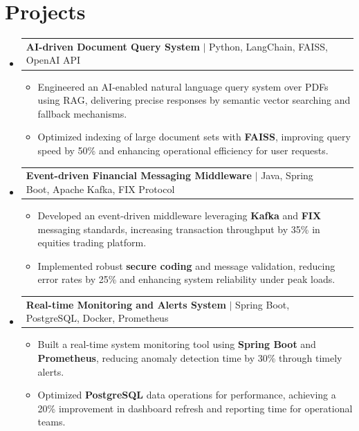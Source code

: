 \documentclass[letterpaper,11pt]{article}
\makeatletter
\newcommand{\resumeItem}[1]{
  \item\footnotesize{
    {#1 \vspace{-2pt}}
  }
}
\newcommand{\resumeProjectHeading}[2]{
    \item
    \begin{tabular*}{1.001\textwidth}{l@{\extracolsep{\fill}}r}
      \small#1 & \textbf{\small #2}\\
    \end{tabular*}\vspace{-7pt}
}
\newcommand{\resumeSubHeadingListStart}{\begin{itemize}[leftmargin=0pt, label={}]}
\newcommand{\resumeSubHeadingListEnd}{\end{itemize}}
\newcommand{\resumeItemListStart}{\begin{itemize}[leftmargin=*]}
\newcommand{\resumeItemListEnd}{\end{itemize}\vspace{-5pt}}
\makeatother
\begin{document}
\section{Projects}
    \vspace{-5pt}
    \resumeSubHeadingListStart

      \resumeProjectHeading
          {\textbf{AI-driven Document Query System} $|$ Python, LangChain, FAISS, OpenAI API}{ }
        \resumeItemListStart
            \resumeItem{Engineered an AI-enabled natural language query system over PDFs using RAG, delivering precise responses by semantic vector searching and fallback mechanisms.}
            \resumeItem{Optimized indexing of large document sets with \textbf{FAISS}, improving query speed by 50\% and enhancing operational efficiency for user requests.}
        \resumeItemListEnd
        \vspace{-12pt}

      \resumeProjectHeading
          {\textbf{Event-driven Financial Messaging Middleware} $|$ Java, Spring Boot, Apache Kafka, FIX Protocol}{ }
        \resumeItemListStart
            \resumeItem{Developed an event-driven middleware leveraging \textbf{Kafka} and \textbf{FIX} messaging standards, increasing transaction throughput by 35\% in equities trading platform.}
            \resumeItem{Implemented robust \textbf{secure coding} and message validation, reducing error rates by 25\% and enhancing system reliability under peak loads.}
        \resumeItemListEnd
        \vspace{-12pt}

      \resumeProjectHeading
          {\textbf{Real-time Monitoring and Alerts System} $|$ Spring Boot, PostgreSQL, Docker, Prometheus}{ }
        \resumeItemListStart
            \resumeItem{Built a real-time system monitoring tool using \textbf{Spring Boot} and \textbf{Prometheus}, reducing anomaly detection time by 30\% through timely alerts.}
            \resumeItem{Optimized \textbf{PostgreSQL} data operations for performance, achieving a 20\% improvement in dashboard refresh and reporting time for operational teams.}
        \resumeItemListEnd

    \resumeSubHeadingListEnd
\end{document}

